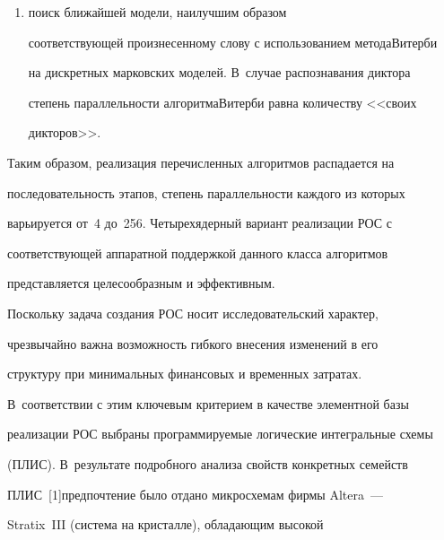 \begin{enumerate}[(1)]
квантуемого вектора к табличному используется евклидово расстояние. 


Максимальная степень параллельности равна количеству векторов в кодовой 


книге (обычно~256);


      \item поиск ближайшей модели, наилучшим образом 


соответ\-ст\-ву\-ющей произнесенному слову с использованием метода\linebreak Витерби 


на дискретных марковских моделей. В~случае распознавания диктора 


степень параллельности алгоритма\linebreak Витерби равна количеству <<своих 


дикторов>>.


      \end{enumerate}


      


      Таким образом, реализация перечисленных алгоритмов распадается на 


последовательность этапов, степень параллельности каждого из которых 


варьируется от~4 до~256. Четырехядерный вариант реализации РОС с 


соответствующей аппаратной поддержкой данного класса алгоритмов 


представляется целесообразным и эффективным. 


      


      Поскольку задача создания РОС носит исследовательский характер, 


чрезвычайно важна возможность гибкого внесения изменений в его 


структуру при минимальных финансовых и временных затратах. 


В~соответствии с этим ключевым критерием в качестве элементной базы 


реализации РОС выбраны программируемые логические интегральные схемы 


(ПЛИС). В~результате подробного анализа свойств конкретных семейств 


ПЛИС~[1]\linebreak предпочтение было отдано микросхемам фирмы Altera~---\linebreak 


Stratix~III (система на кристалле), обладающим высокой 



